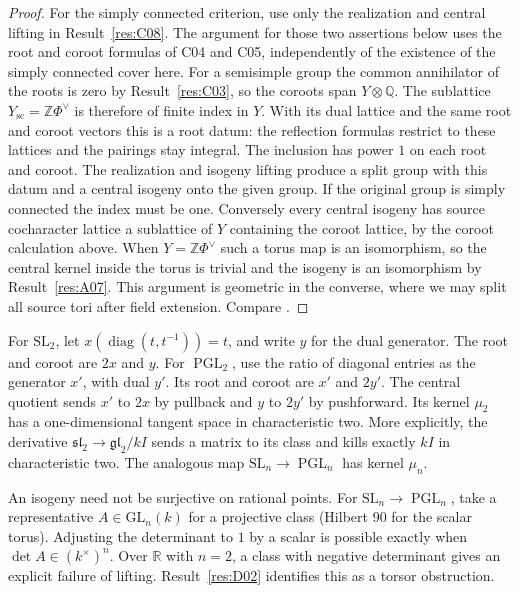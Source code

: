 \documentclass[11pt,a4paper,openany,oneside]{book}
\theoremstyle{resultstyle}
\theoremstyle{definition}
\numberwithin{equation}{chapter}
\newcommand{\GL}{\mathrm{GL}}
\newcommand{\SL}{\mathrm{SL}}
\newcommand{\ZZ}{\mathbb{Z}}
\newcommand{\RR}{\mathbb{R}}
\newcommand{\QQ}{\mathbb{Q}}
\begin{document}
\begin{proof}
For the simply connected criterion, use only the realization
and central lifting in Result~\ref{res:C08}. The argument for
those two assertions below uses the root and coroot formulas
of C04 and C05, independently of the existence of the
simply connected cover here. For a semisimple group
the common annihilator of the roots is zero by
Result~\ref{res:C03}, so the coroots span \(Y\otimes\QQ\).
The sublattice \(Y_{\mathrm{sc}}=\ZZ\Phi^\vee\)
is therefore of finite index in \(Y\). With its dual lattice
and the same root and coroot vectors this is a root datum:
the reflection formulas restrict to these lattices and
the pairings stay integral. The inclusion has power \(1\)
on each root and coroot. The realization and isogeny lifting
produce a split group with this datum and a central isogeny
onto the given group. If the original group is simply
connected the index must be one.
Conversely every central isogeny has source cocharacter
lattice a sublattice of \(Y\) containing the coroot lattice,
by the coroot calculation above. When \(Y=\ZZ\Phi^\vee\)
such a torus map is an isomorphism, so the central kernel
inside the torus is trivial and the isogeny is an isomorphism
by Result~\ref{res:A07}. This argument is geometric in the
converse, where we may split all source tori after field
extension. Compare \cite[Proposition 23.59]{milne}.
\end{proof}

For \(\SL_2\), let \(x(\operatorname{diag}(t,t^{-1}))=t\), and write \(y\) for the dual generator. The root and coroot are \(2x\) and \(y\). For \(\operatorname{PGL}_2\), use the ratio of diagonal entries as the generator \(x'\), with dual \(y'\). Its root and coroot are \(x'\) and \(2y'\). The central quotient sends \(x'\) to \(2x\) by pullback and \(y\) to \(2y'\) by pushforward. Its kernel \(\mu_2\) has a one-dimensional tangent space in characteristic two. More explicitly, the derivative \(\mathfrak{sl}_2\to\mathfrak{gl}_2/kI\) sends a matrix to its class and kills exactly \(kI\) in characteristic two. The analogous map \(\SL_n\to\operatorname{PGL}_n\) has kernel \(\mu_n\).

An isogeny need not be surjective on rational points. For \(\SL_n\to\operatorname{PGL}_n\), take a representative \(A\in\GL_n(k)\) for a projective class (Hilbert 90 for the scalar torus). Adjusting the determinant to \(1\) by a scalar is possible exactly when \(\det A\in(k^\times)^n\). Over \(\RR\) with \(n=2\), a class with negative determinant gives an explicit failure of lifting. Result~\ref{res:D02} identifies this as a torsor obstruction.
\end{document}
